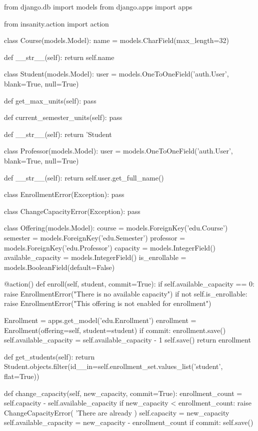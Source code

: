 
\begin{simplecode}
from django.db import models
from django.apps import apps

from insanity.action import action


class Course(models.Model):
    name = models.CharField(max_length=32)

    def __str__(self):
        return self.name


class Student(models.Model):
    user = models.OneToOneField('auth.User', blank=True, null=True)

    def get_max_units(self):
        pass

    def current_semester_units(self):
        pass

    def __str__(self):
        return 'Student%


class Professor(models.Model):
    user = models.OneToOneField('auth.User', blank=True, null=True)

    def __str__(self):
        return self.user.get_full_name()


class EnrollmentError(Exception):
    pass


class ChangeCapacityError(Exception):
    pass


class Offering(models.Model):
    course = models.ForeignKey('edu.Course')
    semester = models.ForeignKey('edu.Semester')
    professor = models.ForeignKey('edu.Professor')
    capacity = models.IntegerField()
    available_capacity = models.IntegerField()
    is_enrollable = models.BooleanField(default=False)

    @action()
    def enroll(self, student, commit=True):
        if self.available_capacity == 0:
            raise EnrollmentError("There is no available capacity")
        if not self.is_enrollable:
            raise EnrollmentError("This offering is not enabled for enrollment")

        Enrollment = apps.get_model('edu.Enrollment')
        enrollment = Enrollment(offering=self, student=student)
        if commit:
            enrollment.save()
            self.available_capacity = self.available_capacity - 1
            self.save()
        return enrollment

    def get_students(self):
        return Student.objects.filter(id__in=self.enrollment_set.values_list('student', flat=True))

    def change_capacity(self, new_capacity, commit=True):
        enrollment_count = self.capacity - self.available_capacity
        if new_capacity < enrollment_count:
            raise ChangeCapacityError(
                'There are already %
            )
        self.capacity = new_capacity
        self.available_capacity = new_capacity - enrollment_count
        if commit:
            self.save()



\end{simplecode}
